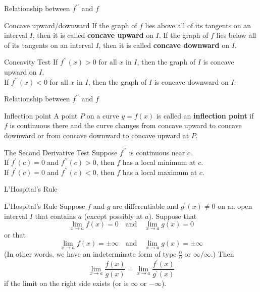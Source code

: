 \documentclass{beamer}
\begin{document}
\begin{frame}{Relationship between $f^{\prime\prime}$ and $f$}
    \begin{block}{Concave upward/downward}
        If the graph of $f$ lies above all of its tangents on an interval $I$, then it is called \textbf{concave upward} on $I$. If the graph of $f$ lies below all of its tangents on an interval $I$, then it is called \textbf{concave downward} on $I$.
    \end{block}
    \begin{block}{Concavity Test}
        If $f^{\prime\prime}(x)>0$ for all $x$ in $I$, then the graph of $I$ is concave upward on $I$.\\
        If $f^{\prime\prime}(x)<0$ for all $x$ in $I$, then the graph of $I$ is concave downward on $I$.
    \end{block}
\end{frame}

\begin{frame}{Relationship between $f^{\prime\prime}$ and $f$}
    \begin{block}{Inflection point}
        A point $P$ on a curve $y=f(x)$ is called an \textbf{inflection point} if $f$ is continuous there and the curve changes from concave upward to concave downward or from concave downward to concave upward at $P$.
    \end{block}
    \begin{block}{The Second Derivative Test}
        Suppose $f^{\prime\prime}$ is continuous near $c$.\\
        If $f^\prime(c)=0$ and $f^{\prime\prime}(c)>0$, then $f$ has a local minimum at $c$.\\
        If $f^\prime(c)=0$ and $f^{\prime\prime}(c)<0$, then $f$ has a local maximum at $c$.
    \end{block}
\end{frame}
\begin{frame}{L'Hospital's Rule}
    \begin{block}{L'Hospital's Rule}
        Suppose $f$ and $g$ are differentiable and $g^\prime(x)\neq0$ on an open interval $I$ that contains $a$ (except possibly at $a$). Suppose that\\
        $$
        \lim_{x\rightarrow a}f(x)=0\quad \text{and}\quad \lim_{x\rightarrow a}g(x)=0
        $$
        or that
        $$
        \lim_{x\rightarrow a}f(x)=\pm\infty\quad \text{and}\quad \lim_{x\rightarrow a}g(x)=\pm\infty
        $$
        (In other words, we have an indeterminate form of type $\frac{0}{0}$ or $\infty/\infty$.) Then\\
        $$
        \lim_{x\rightarrow a}\frac{f(x)}{g(x)}=\lim_{x\rightarrow a}\frac{f^\prime(x)}{g^\prime(x)}
        $$
        if the limit on the right side exists (or is $\infty$ or $-\infty$).
    \end{block}
\end{frame}
\end{document}
